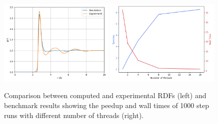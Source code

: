 \documentclass[a4paper,11pt]{article}
\begin{document}
\begin{figure}[ht!]
    \centering
    \includegraphics[width=0.49\textwidth]{../figures/rdf.png}
    \includegraphics[width=0.49\textwidth]{../figures/bench.png}
    \caption{Comparison between computed and experimental RDFs (left) and benchmark results showing the peedup and wall times of 1000 step runs with different number of threads (right).}
    \label{fig:additional}
\end{figure}



\end{document}
